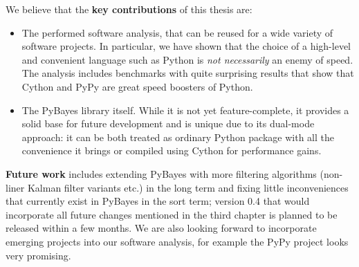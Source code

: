 \noindent{}We believe that the \textbf{key contributions} of this thesis are:
\begin{itemize}
	\item The performed software analysis, that can be reused for a wide variety of software
		projects. In particular, we have shown that the choice of a high-level and convenient
		language such as Python is \emph{not necessarily} an enemy of speed. The analysis includes
		benchmarks with quite surprising results that show that Cython and PyPy are great speed
		boosters of Python.
	\item The PyBayes library itself. While it is not yet feature-complete, it provides a solid base
		for future development and is unique due to its dual-mode approach: it can be both treated
		as ordinary Python package with all the convenience it brings or compiled using Cython for
		performance gains.
\end{itemize}
\textbf{Future work} includes extending PyBayes with more filtering algorithms (non-liner Kalman
filter variants etc.) in the long term and fixing little inconveniences that currently exist in
PyBayes in the sort term; version 0.4 that would incorporate all future changes mentioned in the
third chapter is planned to be released within a few months. We are also looking forward to
incorporate emerging projects into our software analysis, for example the PyPy project looks very
promising.

